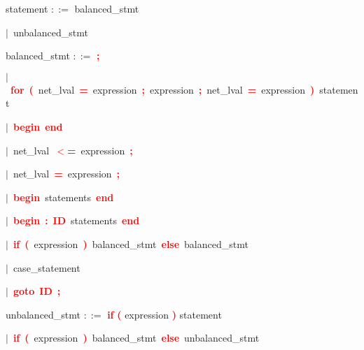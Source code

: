\vspace{1em}
\noindent
\settowidth{\parindent}{\hspace{4ex}}
statement $::=$\hspace{1ex} balanced\_stmt

\mbox{$|$ unbalanced\_stmt}

\vspace{1em}
\noindent
\settowidth{\parindent}{\hspace{4ex}}
balanced\_stmt $::=$\hspace{1ex} \textbf{\textcolor{red}{;}}

\mbox{$|$ \textbf{\textcolor{red}{for}} \textbf{\textcolor{red}{(}} net\_lval \textbf{\textcolor{red}{=}} expression \textbf{\textcolor{red}{;}} expression \textbf{\textcolor{red}{;}} net\_lval \textbf{\textcolor{red}{=}} expression \textbf{\textcolor{red}{)}} statement}

\mbox{$|$ \textbf{\textcolor{red}{begin}} \textbf{\textcolor{red}{end}}}

\mbox{$|$ net\_lval \textbf{\textcolor{red}{$<$=}} expression \textbf{\textcolor{red}{;}}}

\mbox{$|$ net\_lval \textbf{\textcolor{red}{=}} expression \textbf{\textcolor{red}{;}}}

\mbox{$|$ \textbf{\textcolor{red}{begin}} statements \textbf{\textcolor{red}{end}}}

\mbox{$|$ \textbf{\textcolor{red}{begin}} \textbf{\textcolor{red}{:}} \textbf{\textcolor{red}{ID}} statements \textbf{\textcolor{red}{end}}}

\mbox{$|$ \textbf{\textcolor{red}{if}} \textbf{\textcolor{red}{(}} expression \textbf{\textcolor{red}{)}} balanced\_stmt \textbf{\textcolor{red}{else}} balanced\_stmt}

\mbox{$|$ case\_statement}

\mbox{$|$ \textbf{\textcolor{red}{goto}} \textbf{\textcolor{red}{ID}} \textbf{\textcolor{red}{;}}}

\vspace{1em}
\noindent
\settowidth{\parindent}{\hspace{4ex}}
unbalanced\_stmt $::=$\hspace{1ex} \textbf{\textcolor{red}{if}} \textbf{\textcolor{red}{(}} expression \textbf{\textcolor{red}{)}} statement

\mbox{$|$ \textbf{\textcolor{red}{if}} \textbf{\textcolor{red}{(}} expression \textbf{\textcolor{red}{)}} balanced\_stmt \textbf{\textcolor{red}{else}} unbalanced\_stmt}


